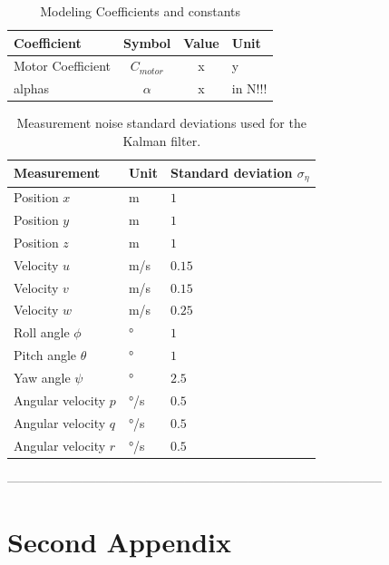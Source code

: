 \begin{table}[htbp]
	\centering
	\caption{Modeling Coefficients and constants}
	\label{tab:todo}
	\renewcommand{\arraystretch}{1.2}
	\begin{tabular}{|l|c|c|l|}
		\hline
		\textbf{Coefficient} & \textbf{Symbol} & \textbf{Value} & \textbf{Unit} \\
		\hline
		Motor Coefficient & $C_{motor}$ & x & y \\
		alphas & $\alpha$ & x & in N!!! \\
		\hline
	\end{tabular}
\end{table}



\begin{table}[h]
	\centering
	\caption{Measurement noise standard deviations used for the Kalman filter.}
	\label{tab:measurement_noise}
	\begin{tabular}{lll}
		\toprule
		Measurement & Unit & Standard deviation $\sigma_{\eta}$ \\
		\midrule
		Position $x$ & m & $1$ \\
		Position $y$ & m & $1$ \\
		Position $z$ & m & $1$ \\
		Velocity $u$ & m/s & $0.15$ \\
		Velocity $v$ & m/s & $0.15$ \\
		Velocity $w$ & m/s & $0.25$ \\
		Roll angle $\phi$ & ° & $1$ \\
		Pitch angle $\theta$ & ° & $1$ \\
		Yaw angle $\psi$ & ° & $2.5$ \\
		Angular velocity $p$ & °/s & $0.5$ \\
		Angular velocity $q$ & °/s & $0.5$ \\
		Angular velocity $r$ & °/s & $0.5$ \\
		\bottomrule
	\end{tabular}
\end{table}











 -----------------------------------------------------------------------------------------
\chapter{Second Appendix}%
\label{chap:appenB}

